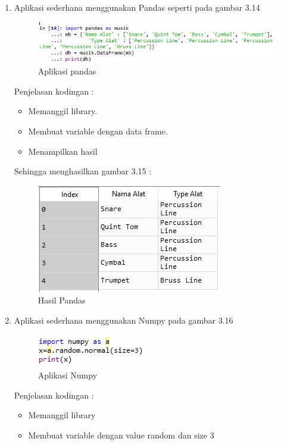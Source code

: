 \begin{enumerate}
\item Aplikasi sederhana menggunakan Pandas seperti pada gambar 3.14
	\begin{figure}[ht]
	\centering
	\includegraphics[scale=0.7]{figures/PRF/1_1.png}
	\caption{Aplikasi pandas}
	\end{figure}
	\par Penjelasan kodingan :
		\begin{itemize}
		\item Memanggil library.
		\item Membuat variable dengan data frame.
		\item Menampilkan hasil
		\end{itemize}
	\par Sehingga menghasilkan gambar 3.15 :
	\begin{figure}[ht]
	\centering
	\includegraphics[scale=0.7]{figures/PRF/1_2.png}
	\caption{Hasil Pandas}
	\end{figure}
\item Aplikasi sederhana menggunakan Numpy pada gambar 3.16
	\begin{figure}[ht]
	\centering
	\includegraphics[scale=0.9]{figures/PRF/2_1.png}
	\caption{Aplikasi Numpy}
	\end{figure}
	\par Penjelasan kodingan :
		\begin{itemize}
		\item Memanggil library
		\item Membuat variable dengan value random dan size 3

\end{itemize}
\end{enumerate}
